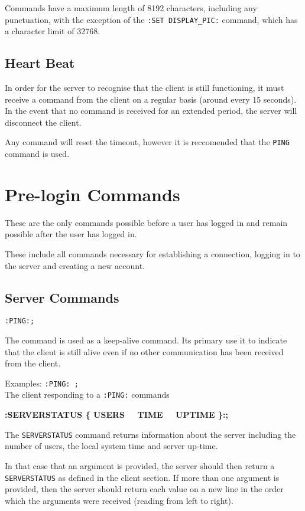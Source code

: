 Commands have a maximum length of 8192 characters, including any punctuation, with the exception of the \texttt{:SET DISPLAY\_PIC:} command, which has a character limit of 32768.

\subsection*{Heart Beat}

In order for the server to recognise that the client is still functioning, it must receive a command from the client on a regular basis (around every 15 seconds). In the event that no command is received for an extended period, the server will disconnect the client.

Any command will reset the timeout, however it is reccomended that the \texttt{PING} command is used.

\section{Pre-login Commands}

These are the only commands possible before a user has logged in and remain possible after the user has logged in.

These include all commands necessary for establishing a connection, logging in to the server and creating a new account.

\subsection*{Server Commands}

\texttt{:PING:;}

The command is used as a keep-alive command. Its primary use it to indicate that the client is still alive even if no other communication has been received from the client. 

Examples:
\texttt{:PING: ;} \\
The client responding to a \texttt{:PING:} commands

{\bf :SERVERSTATUS \{ USERS \ \vline \ TIME \ \vline \ UPTIME \}:;}

The \texttt{SERVERSTATUS} command returns information about the server including the number of users, the local system time and server up-time.
 
In that case that an argument is provided, the server should then return a \texttt{SERVERSTATUS} as defined in the client section. If more than one argument is provided, then the server should return each value on a new line in the order which the arguments were received (reading from left to right).

